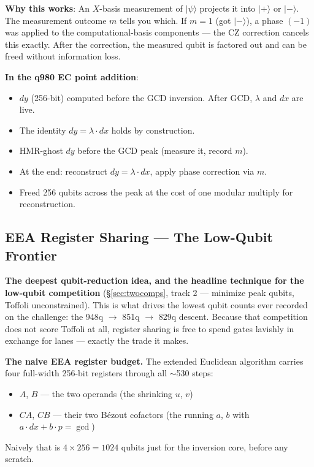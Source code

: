 \documentclass[11pt,a4paper]{article}
\begin{document}
\textbf{Why this works}: An $X$-basis measurement of $|\psi\rangle$ projects it into $|+\rangle$
or $|-\rangle$. The measurement outcome $m$ tells you which. If $m = 1$ (got $|-\rangle$), a
phase $(-1)$ was applied to the computational-basis components --- the CZ correction cancels this
exactly. After the correction, the measured qubit is factored out and can be freed without
information loss.

\textbf{In the q980 EC point addition}:
\begin{itemize}
  \item $dy$ (256-bit) computed before the GCD inversion. After GCD, $\lambda$ and $dx$ are live.
  \item The identity $dy = \lambda \cdot dx$ holds by construction.
  \item HMR-ghost $dy$ before the GCD peak (measure it, record $m$).
  \item At the end: reconstruct $dy = \lambda \cdot dx$, apply phase correction via $m$.
  \item Freed 256 qubits across the peak at the cost of one modular multiply for reconstruction.
\end{itemize}

\subsection{EEA Register Sharing --- The Low-Qubit Frontier}
\label{sec:regshare}

\textbf{The deepest qubit-reduction idea, and the headline technique for the low-qubit competition}
(\S\ref{sec:twocomps}, track 2 --- minimize peak qubits, Toffoli unconstrained). This is what drives
the lowest qubit counts ever recorded on the challenge: the 948q $\to$ 851q $\to$ 829q descent.
Because that competition does not score Toffoli at all, register sharing is free to spend gates
lavishly in exchange for lanes --- exactly the trade it makes.

\textbf{The naive EEA register budget.} The extended Euclidean algorithm carries four full-width
256-bit registers through all $\sim$530 steps:
\begin{itemize}
  \item $A$, $B$ --- the two operands (the shrinking $u$, $v$)
  \item $CA$, $CB$ --- their two B\'ezout cofactors (the running $a$, $b$ with $a\cdot dx + b\cdot p = \gcd$)
\end{itemize}
Naively that is $4 \times 256 = 1024$ qubits just for the inversion core, before any scratch.
\end{document}
